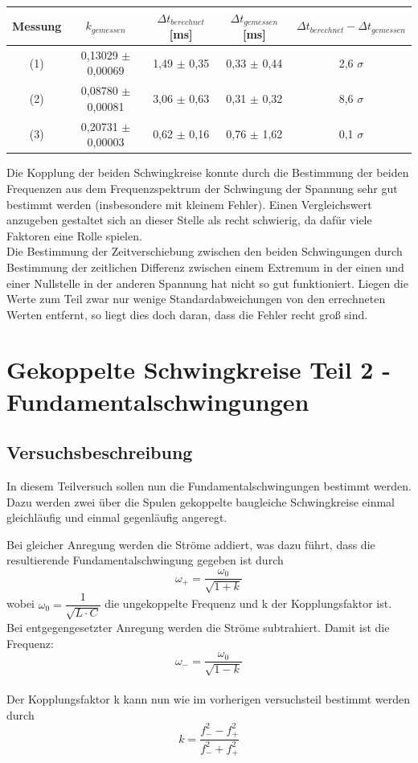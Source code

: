 \documentclass[12pt,a4paper]{article}
\begin{document}
\begin{center}
\begin{tabular}{|c|c|c|c|c|}
\hline 
Messung & $k_{gemessen}$ & $\Delta t_{berechnet}$ [ms] & $\Delta t_{gemessen}$ [ms] & $\Delta t_{berechnet} - \Delta t_{gemessen}$  \\ 
\hline 
(1) & 0,13029 $\pm$ 0,00069 & 1,49 $\pm$ 0,35 & 0,33 $\pm$ 0,44 & 2,6 $\sigma$ \\ 
\hline 
(2) & 0,08780 $\pm$ 0,00081 & 3,06 $\pm$ 0,63 & 0,31 $\pm$ 0,32 & 8,6 $\sigma$ \\ 
\hline 
(3) & 0,20731 $\pm$ 0,00003 & 0,62 $\pm$ 0,16 & 0,76 $\pm$ 1,62 & 0,1 $\sigma$ \\ 
\hline 
\end{tabular} 
\end{center}

Die Kopplung der beiden Schwingkreise konnte durch die Bestimmung der beiden Frequenzen aus dem Frequenzspektrum der Schwingung der Spannung sehr gut bestimmt werden (insbesondere mit kleinem Fehler). Einen Vergleichswert anzugeben gestaltet sich an dieser Stelle als recht schwierig, da dafür viele Faktoren eine Rolle spielen. \\
Die Bestimmung der Zeitverschiebung zwischen den beiden Schwingungen durch Bestimmung der zeitlichen Differenz zwischen einem Extremum in der einen und einer Nullstelle in der anderen Spannung hat nicht so gut funktioniert. Liegen die Werte zum Teil zwar nur wenige Standardabweichungen von den errechneten Werten entfernt, so liegt dies doch daran, dass die Fehler recht groß sind.
\newpage
\section{Gekoppelte Schwingkreise Teil 2 - Fundamentalschwingungen}
\subsection{Versuchsbeschreibung}
In diesem Teilversuch sollen nun die Fundamentalschwingungen bestimmt werden. Dazu werden zwei über die Spulen gekoppelte baugleiche Schwingkreise einmal gleichläufig und einmal gegenläufig angeregt.

Bei gleicher Anregung werden die Ströme addiert, was dazu führt, dass die resultierende Fundamentalschwingung gegeben ist durch
\begin{equation}
\omega_+ =\dfrac{\omega_0}{\sqrt{1+k}}
\end{equation}
wobei $\omega_0 = \dfrac{1}{\sqrt{L\cdot C}}$ die ungekoppelte Frequenz und k der Kopplungsfaktor ist.\\
Bei entgegengesetzter Anregung werden die Ströme subtrahiert. Damit ist die Frequenz:
\begin{equation}
\omega_- =\dfrac{\omega_0}{\sqrt{1-k}}
\end{equation}
\\
Der Kopplungsfaktor k kann nun wie im vorherigen versuchsteil bestimmt werden durch
\begin{equation}
k = \dfrac{f_-^2 - f_+^2}{f_-^2 + f_+^2}
\label{eq:Kopplung2}
\end{equation}
\end{document}

